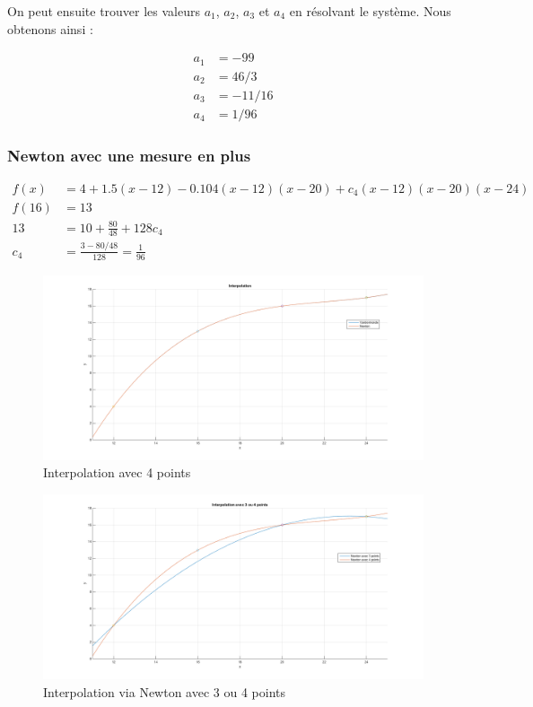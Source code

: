 On peut ensuite trouver les valeurs $a_1$, $a_2$, $a_3$ et $a_4$ en résolvant le système. Nous obtenons ainsi :

\begin{equation}
	\begin{aligned}
		a_1 &= -99\\
		a_2 &= 46/3\\
		a_3 &= -11/16\\
		a_4 &= 1/96
	\end{aligned}
\end{equation}

\subsubsection{Newton avec une mesure en plus}

\begin{equation}
	\begin{aligned}
		f(x) &= 4 + 1.5(x-12) - 0.104(x-12)(x-20) + c_4(x-12)(x-20)(x-24)\\
		f(16) &= 13\\
		13 &= 10 + \frac{80}{48}+128c_4\\
		c_4 &= \frac{3-80/48}{128} = \frac{1}{96}
	\end{aligned}
\end{equation}

\begin{figure}[H]
	\centering
	\caption{\label{4pts} Interpolation avec 4 points}
	\includegraphics[scale = 0.4]{Figures/6_interpolation_2.png}
\end{figure}

\begin{figure}[H]
	\centering
	\caption{\label{3ou4} Interpolation via Newton avec 3 ou 4 points}
	\includegraphics[scale = 0.4]{Figures/6_interpolation_3ou4.png}
\end{figure}


